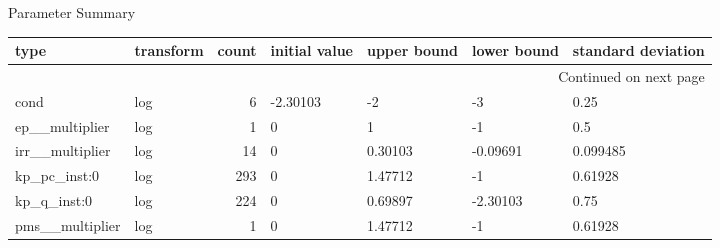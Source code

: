 \documentclass{article}
\begin{document}
\begin{center}
Parameter Summary
\end{center}
\begin{center}
\begin{landscape}
\begin{longtable}{llrllll}
\toprule
            type & transform &  count & initial value & upper bound & lower bound & standard deviation \\
\midrule
\endhead
\midrule
\multicolumn{7}{r}{{Continued on next page}} \\
\midrule
\endfoot

\bottomrule
\endlastfoot
            cond &       log &      6 &      -2.30103 &          -2 &          -3 &               0.25 \\
  ep\_\_multiplier &       log &      1 &             0 &           1 &          -1 &                0.5 \\
 irr\_\_multiplier &       log &     14 &             0 &     0.30103 &    -0.09691 &           0.099485 \\
    kp\_pc\_inst:0 &       log &    293 &             0 &     1.47712 &          -1 &            0.61928 \\
     kp\_q\_inst:0 &       log &    224 &             0 &     0.69897 &    -2.30103 &               0.75 \\
 pms\_\_multiplier &       log &      1 &             0 &     1.47712 &          -1 &            0.61928 \\
\end{longtable}
\end{landscape}
\end{center}
\end{document}

